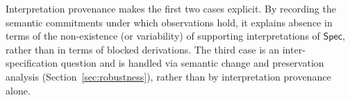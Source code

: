 \documentclass[acmsmall,nonacm]{acmart}
\theoremstyle{remark}
\numberwithin{definition}{section}
\numberwithin{theorem}{section}
\numberwithin{lemma}{section}
\numberwithin{corollary}{section}
\numberwithin{remark}{section}
\numberwithin{example}{section}
\numberwithin{observation}{section}
\numberwithin{assumption}{section}
\newcommand{\Spec}{\mathsf{Spec}}
\begin{document}
Interpretation provenance makes the first two cases explicit.
By recording the semantic commitments under which observations hold, it explains
absence in terms of the non-existence (or variability) of supporting
interpretations of $\Spec$, rather than in terms of blocked derivations.
The third case is an inter-specification question and is handled via semantic
change and preservation analysis (Section~\ref{sec:robustness}), rather than by
interpretation provenance alone.


\end{document}
